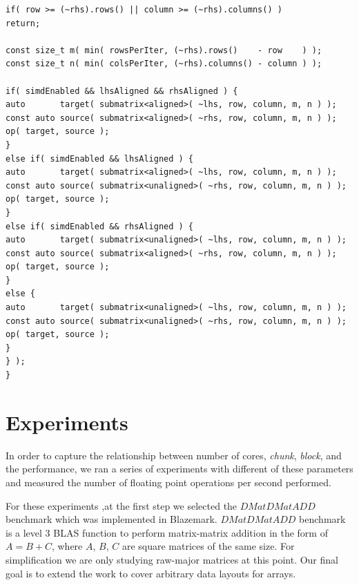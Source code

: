 \begin{lstlisting}[basicstyle=\fontsize{8}{9}\selectfont,float,floatplacement=H,caption= {New implementation of Assign function for HPX backend in Blaze.}, label={new_hpx_backend}]
if( row >= (~rhs).rows() || column >= (~rhs).columns() )
return;

const size_t m( min( rowsPerIter, (~rhs).rows()    - row    ) );
const size_t n( min( colsPerIter, (~rhs).columns() - column ) );

if( simdEnabled && lhsAligned && rhsAligned ) {
auto       target( submatrix<aligned>( ~lhs, row, column, m, n ) );
const auto source( submatrix<aligned>( ~rhs, row, column, m, n ) );
op( target, source );
}
else if( simdEnabled && lhsAligned ) {
auto       target( submatrix<aligned>( ~lhs, row, column, m, n ) );
const auto source( submatrix<unaligned>( ~rhs, row, column, m, n ) );
op( target, source );
}
else if( simdEnabled && rhsAligned ) {
auto       target( submatrix<unaligned>( ~lhs, row, column, m, n ) );
const auto source( submatrix<aligned>( ~rhs, row, column, m, n ) );
op( target, source );
}
else {
auto       target( submatrix<unaligned>( ~lhs, row, column, m, n ) );
const auto source( submatrix<unaligned>( ~rhs, row, column, m, n ) );
op( target, source );
}
} );
}
\end{lstlisting}
\vspace{\baselineskip}	

\vspace{\baselineskip}	
\section{Experiments}
In order to capture the relationship between number of cores, \textit{chunk}, \textit{block}, and the performance, we ran a series of experiments with different of these parameters and measured the number of floating point operations per second performed. 

For these experiments ,at the first step we selected the $DMatDMatADD$ benchmark which was implemented in Blazemark. $DMatDMatADD$ benchmark is a level 3 BLAS function to perform matrix-matrix addition in the form of $A=B+C$, where $A$, $B$, $C$ are square matrices of the same size. For simplification we are only studying raw-major matrices at this point. Our final goal is to extend the work to cover arbitrary data layouts for arrays.

